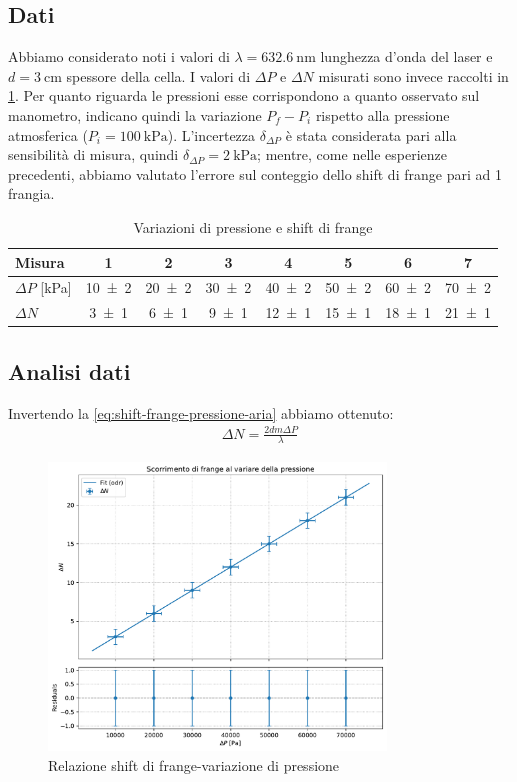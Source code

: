 \documentclass[a4paper]{article}
\begin{document}
\subsection{Dati}
Abbiamo considerato noti i valori di $\lambda=\SI{632.6}{\nano\meter}$ lunghezza d'onda del laser e $d=\SI{3}{\centi\meter}$ spessore della cella. I valori di $\Delta P$ e $\Delta N$ misurati sono invece raccolti in \cref{tab:delta-p-e-delta-n}. Per quanto riguarda le pressioni esse corrispondono a quanto osservato sul manometro, indicano quindi la variazione $P_f- P_i$ rispetto alla pressione atmosferica ($P_i = \SI{100}{\kilo\pascal}$). L'incertezza $\delta_{\Delta P}$ è stata considerata pari alla sensibilità di misura, quindi $\delta_{\Delta P}=\SI{2}{\kilo\pascal}$; mentre, come nelle esperienze precedenti, abbiamo valutato l'errore sul conteggio dello shift di frange pari ad 1 frangia.

\begin{table}[htbp]
\centering
\caption{Variazioni di pressione e shift di frange}
\label{tab:delta-p-e-delta-n}
\begin{tabular}{|l|ccccccc|}
\hline
Misura & 1 & 2 & 3 & 4 & 5 & 6 & 7 \\\hline\hline
$\Delta P$ [\si{\kilo\pascal}] & \num{10 \pm 2} & \num{20 \pm 2} & \num{30 \pm 2} & \num{40 \pm 2} & \num{50 \pm 2} & \num{60 \pm 2} & \num{70 \pm 2} \\\hline
$\Delta N$ & \num{3 \pm 1} & \num{6 \pm 1} & \num{9 \pm 1} & \num{12 \pm 1} & \num{15 \pm 1} & \num{18 \pm 1} & \num{21 \pm 1} \\\hline
\end{tabular}
\end{table}

\subsection{Analisi dati}
Invertendo la \cref{eq:shift-frange-pressione-aria} abbiamo ottenuto:
\begin{align}
    \Delta N = \frac{2dm \Delta P}{\lambda}
\end{align}

\begin{figure}[htbp]
\centering
\includegraphics[width=0.8\textwidth]{./grafici/indice_aria.pdf}
\caption{Relazione shift di frange-variazione di pressione}
\label{fig:indice-aria}
\end{figure}
\end{document}
